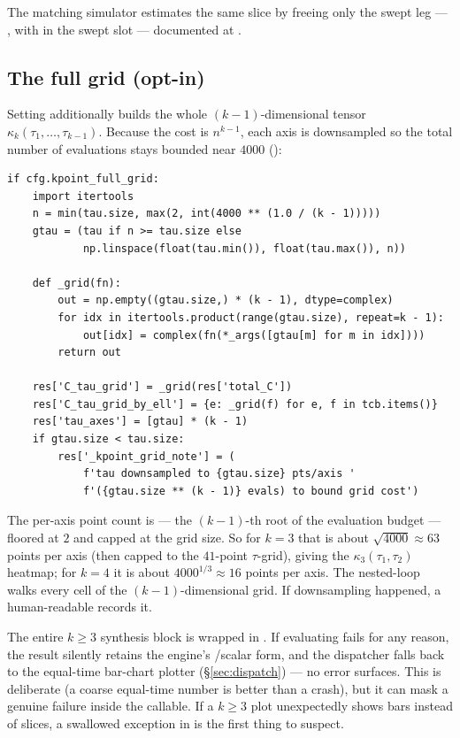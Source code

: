 The matching simulator estimates the same slice by freeing only the swept leg ---
, with  in the swept slot ---
documented at .

\subsection{The full grid (opt-in)}

Setting  additionally builds the whole
$(k-1)$-dimensional tensor $\kappa_k(\tau_1,\ldots,\tau_{k-1})$. Because the cost
is $n^{k-1}$, each axis is downsampled so the total number of evaluations stays
bounded near $4000$ ():

\begin{lstlisting}
if cfg.kpoint_full_grid:
    import itertools
    n = min(tau.size, max(2, int(4000 ** (1.0 / (k - 1)))))
    gtau = (tau if n >= tau.size else
            np.linspace(float(tau.min()), float(tau.max()), n))

    def _grid(fn):
        out = np.empty((gtau.size,) * (k - 1), dtype=complex)
        for idx in itertools.product(range(gtau.size), repeat=k - 1):
            out[idx] = complex(fn(*_args([gtau[m] for m in idx])))
        return out

    res['C_tau_grid'] = _grid(res['total_C'])
    res['C_tau_grid_by_ell'] = {e: _grid(f) for e, f in tcb.items()}
    res['tau_axes'] = [gtau] * (k - 1)
    if gtau.size < tau.size:
        res['_kpoint_grid_note'] = (
            f'tau downsampled to {gtau.size} pts/axis '
            f'({gtau.size ** (k - 1)} evals) to bound grid cost')
\end{lstlisting}

The per-axis point count is  --- the
$(k-1)$-th root of the evaluation budget --- floored at $2$ and capped at the grid
size. So for $k=3$ that is about $\sqrt{4000}\approx63$ points per axis (then
capped to the $41$-point $\tau$-grid), giving the $\kappa_3(\tau_1,\tau_2)$
heatmap; for $k=4$ it is about $4000^{1/3}\approx16$ points per axis. The
nested-loop  walks every cell
of the $(k-1)$-dimensional grid. If downsampling happened, a human-readable
 records it.

\begin{gotcha}
The entire $k\ge3$ synthesis block is wrapped in
. If evaluating  fails for any
reason, the result silently retains the engine's /scalar form,
and the dispatcher falls back to the equal-time bar-chart plotter
(\S\ref{sec:dispatch}) --- no error surfaces. This is deliberate (a coarse
equal-time number is better than a crash), but it can mask a genuine failure inside
the callable. If a $k\ge3$ plot unexpectedly shows bars instead of slices, a
swallowed exception in  is the first thing to suspect.
\end{gotcha}

